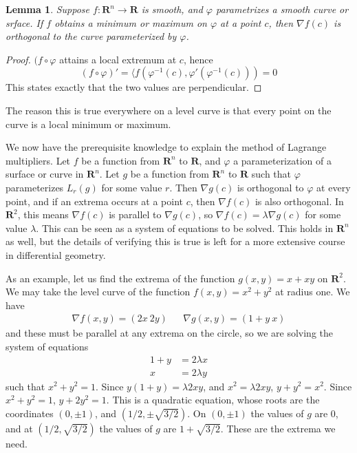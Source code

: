 \documentclass[12pt]{amsbook}
\theoremstyle{plain}
\newtheorem{lemma}[theorem]{Lemma}
\theoremstyle{definition}
\begin{document}
\begin{lemma}
    Suppose $f:\mathbf{R}^n \to \mathbf{R}$ is smooth, and $\varphi$ parametrizes a smooth curve or srface. If $f$ obtains a minimum or maximum on $\varphi$ at a point $c$, then $\nabla f(c)$ is orthogonal to the curve parameterized by $\varphi$.
\end{lemma}
\begin{proof}
    $(f \circ \varphi$ attains a local extremum at $c$, hence
    \[ (f \circ \varphi)' = \langle f(\varphi^{-1}(c), \varphi'(\varphi^{-1}(c))) = 0 \]
    This states exactly that the two values are perpendicular.
\end{proof}

The reason this is true everywhere on a level curve is that every point on the curve is a local minimum or maximum.

We now have the prerequisite knowledge to explain the method of Lagrange multipliers. Let $f$ be a function from $\mathbf{R}^n$ to $\mathbf{R}$, and $\varphi$ a parameterization of a surface or curve in $\mathbf{R}^n$. Let $g$ be a function from $\mathbf{R}^n$ to $\mathbf{R}$ such that $\varphi$ parameterizes $L_r(g)$ for some value $r$. Then $\nabla g(c)$ is orthogonal to $\varphi$ at every point, and if an extrema occurs at a point $c$, then $\nabla f(c)$ is also orthogonal. In $\mathbf{R}^2$, this means $\nabla f(c)$ is parallel to $\nabla g(c)$, so $\nabla f(c) = \lambda \nabla g(c)$ for some value $\lambda$. This can be seen as a system of equations to be solved. This holds in $\mathbf{R}^n$ as well, but the details of verifying this is true is left for a more extensive course in differential geometry.

As an example, let us find the extrema of the function $g(x,y) = x + xy$ on $\mathbf{R}^2$. We may take the level curve of the function $f(x,y) = x^2 + y^2$ at radius one. We have
%
\begin{align*}
    \nabla f(x,y) = (2x\ 2y) && \nabla g(x,y) = (1 + y\ x)
\end{align*}
%
and these must be parallel at any extrema on the circle, so we are solving the system of equations
%
\begin{align*}
    1 + y &= 2 \lambda x\\
    x &= 2 \lambda y
\end{align*}
%
such that $x^2 + y^2 = 1$. Since $y(1 + y) = \lambda 2xy$, and $x^2 = \lambda 2xy$, $y + y^2 = x^2$. Since $x^2 + y^2 = 1$, $y + 2y^2 = 1$. This is a quadratic equation, whose roots are the coordinates $(0, \pm 1)$, and $(1/2, \pm \sqrt{3/2})$. On $(0,\pm 1)$ the values of $g$ are 0, and at $(1/2, \sqrt{3/2})$ the values of $g$ are $1 + \sqrt{3/2}$. These are the extrema we need.
\end{document}

